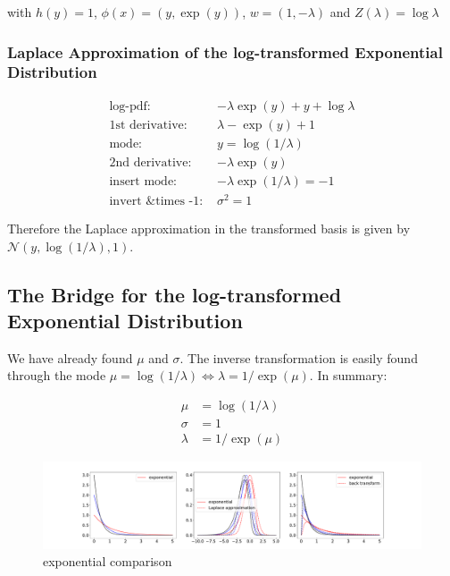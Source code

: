 with $h(y) =1$, $\phi(x) = (y, \exp(y))$, $w = (1, -\lambda)$ and $Z(\lambda)=\log\lambda$

\subsubsection{Laplace Approximation of the log-transformed Exponential Distribution}

\begin{align*}
\text{log-pdf: } & -\lambda \exp(y) + y + \log\lambda \\
\text{1st derivative: }& \lambda -\exp(y) + 1 \\
\text{mode: } & y = \log(1/\lambda) \\
\text{2nd derivative: }& -\lambda\exp(y)\\
\text{insert mode: }& -\lambda\exp(1/\lambda) = -1\\
\text{invert \& times -1: }&\sigma^2 = 1
\end{align*}

Therefore the Laplace approximation in the transformed basis is given by $\mathcal{N}(y, \log(1/\lambda), 1)$. 

\subsection{The Bridge for the log-transformed Exponential Distribution}

We have already found $\mu$ and $\sigma$. The inverse transformation is easily found through the mode $\mu = \log(1/\lambda) \Leftrightarrow \lambda = 1/\exp(\mu)$. In summary:

\begin{align}
	\mu &= \log(1/\lambda) \\
	\sigma &= 1 \\
	\lambda &= 1/\exp(\mu)
\end{align}

\begin{figure}
	\centering
	\includegraphics[width=\textwidth]{figures/exponential_playground.pdf}
	\caption{exponential comparison}
	\label{fig:exponential_comparison}
\end{figure}

